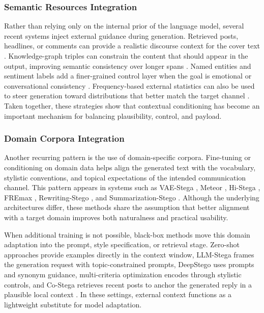 \subsubsection{Semantic Resources Integration}

Rather than relying only on the internal prior of the language model, several recent systems inject external guidance during generation. Retrieved posts, headlines, or comments can provide a realistic discourse context for the cover text \cite{wang2023hi}. Knowledge-graph triples can constrain the content that should appear in the output, improving semantic consistency over longer spans \cite{li2024semantic}. Named entities and sentiment labels add a finer-grained control layer when the goal is emotional or conversational consistency \cite{shi2025emotionally}. Frequency-based external statistics can also be used to steer generation toward distributions that better match the target channel \cite{pang2024fremax}. Taken together, these strategies show that contextual conditioning has become an important mechanism for balancing plausibility, control, and payload.


\subsubsection{Domain Corpora Integration}

Another recurring pattern is the use of domain-specific corpora. Fine-tuning or conditioning on domain data helps align the generated text with the vocabulary, stylistic conventions, and topical expectations of the intended communication channel. This pattern appears in systems such as VAE-Stega \cite{yang2020vae}, Meteor \cite{kaptchuk2021meteor}, Hi-Stega \cite{wang2023hi}, FREmax \cite{pang2024fremax}, Rewriting-Stego \cite{li2023rewriting}, and Summarization-Stego \cite{zhang2024controllable}. Although the underlying architectures differ, these methods share the assumption that better alignment with a target domain improves both naturalness and practical usability.

When additional training is not possible, black-box methods move this domain adaptation into the prompt, style specification, or retrieval stage. Zero-shot approaches provide examples directly in the context window, LLM-Stega frames the generation request with topic-constrained prompts, DeepStego uses prompts and synonym guidance, multi-criteria optimization encodes through stylistic controls, and Co-Stega retrieves recent posts to anchor the generated reply in a plausible local context \cite{lin2024zero,wu2024generative,kuznetsov2025deepstego,wozniak2025multicriteria,liao2024co}. In these settings, external context functions as a lightweight substitute for model adaptation.

